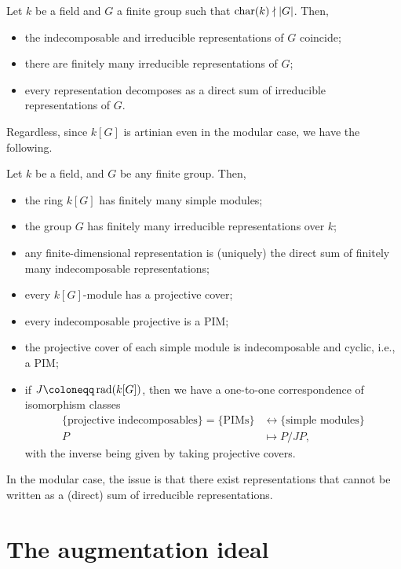 \documentclass[12pt]{article}
\begin{document}
\begin{cor}
	Let $k$ be a field and $G$ a finite group such that $\operatorname{char}(k) \nmid {\left\lvert G \right\lvert}$. 
	Then, 
	\begin{itemize}
		\item the indecomposable and irreducible representations of $G$ coincide;
		\item there are finitely many irreducible representations of $G$;
		\item every representation decomposes as a direct sum of irreducible representations of $G$.
	\end{itemize}
\end{cor}

Regardless, since $k[G]$ is artinian even in the modular case, we have the following.
\begin{thm} \label{thm:facts-about-kG}
	Let $k$ be a field, and $G$ be any finite group. 
	Then,
	\begin{itemize}
		\item the ring $k[G]$ has finitely many simple modules;
		\item the group $G$ has finitely many irreducible representations over $k$;
		\item any finite-dimensional representation is (uniquely) the direct sum of finitely many indecomposable representations;
		\item every $k[G]$-module has a projective cover;
		\item every indecomposable projective is a PIM;
		\item the projective cover of each simple module is indecomposable and cyclic, i.e., a PIM;
		\item if $J \coloneqq \rad(k[G])$, then we have a one-to-one correspondence of isomorphism classes
		\begin{align*} 
			\{\text{projective indecomposables}\} = \{\text{PIMs}\} & \leftrightarrow \{\text{simple modules}\} \\
			P & \mapsto P/JP,
		\end{align*}
		with the inverse being given by taking projective covers.
	\end{itemize}
\end{thm}
In the modular case, the issue is that there exist representations that cannot be written as a (direct) sum of irreducible representations.

\section{The augmentation ideal}
\end{document}
